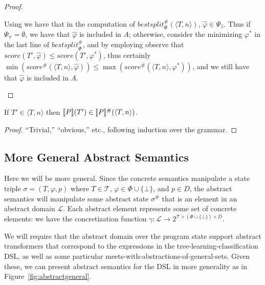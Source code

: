 \begin{proof}
\begin{itemize}
        Using \rone we have that in the computation of $\mathit{bestsplit}^\#_\Phi(\langle T, n \rangle)$,
        $\hat{\varphi} \in \Psi_\exists$.
        Thus if $\Psi_\forall = \emptyset$, we have that $\hat{\varphi}$ is included in $A$;
        otherwise, consider the minimizing $\varphi^*$ in the last line of $\mathit{bestsplit}^\#_\Phi$,
        and by employing \rtwo observe that $\mathit{score}(T', \hat{\varphi}) \leq \mathit{score}(T', \varphi^*)$,
        thus certainly $\min(\mathit{score}^\#(\langle T, n \rangle, \hat{\varphi})) \leq
        \max(\mathit{score}^\#(\langle T, n \rangle, \varphi^*))$,
        and we still have that $\hat{\varphi}$ is included in $A$.
\end{itemize}
\end{proof}
\begin{theorem}[Soundness]
If $T' \in \langle T, n \rangle$ then $\den{P}(T') \in \den{P}^\#(\langle T, n \rangle)$.
\end{theorem}
\begin{proof}
``Trivial,'' ``obvious,'' etc., following induction over the grammar.
\end{proof}



\subsection{More General Abstract Semantics}

Here we will be more general.
Since the concrete semantics manipulate a state triple $\sigma = (T, \varphi, p)$
where $T \in \mathcal{T}$, $\varphi \in \Phi \cup \{ \bot \}$, and $p \in D$,
the abstract semantics will manipulate some abstract state $\sigma^\#$
that is an element in an abstract domain $\mathcal{L}$.
Each abstract element represents some set of concrete elements:
we have the concretization function
$\gamma : \mathcal{L} \rightarrow 2^{\mathcal{T} \times (\Phi \cup \{\bot\}) \times D}$.

We will require that the abstract domain over the program state
support abstract transformers that correspond to the expressions
in the tree-learning-classification DSL,
as well as some particular meets-with-abstractions-of-general-sets.
Given these, we can present abstract semantics for the DSL in more generality
as in Figure~\ref{fig:abstractgeneral}.

